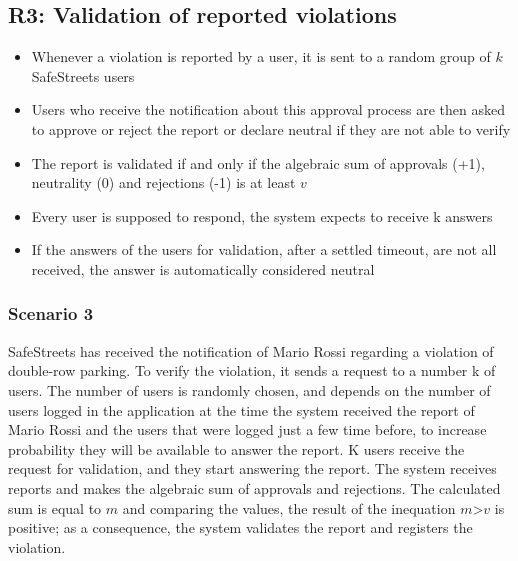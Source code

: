 \subsection{R3: Validation of reported violations}
\begin{itemize}
    \item Whenever a violation is reported by a user, it is sent to a random group of $k$ SafeStreets users
    \item Users who receive the notification about this approval process are then asked to approve or reject the report or declare neutral if they are not able to verify
    \item The report is validated if and only if the algebraic sum of approvals (+1), neutrality (0) and rejections (-1) is at least $v$
    \item Every user is supposed to respond, the system expects to receive k answers
    \item If the answers of the users for validation, after a settled timeout, are not all received, the answer is automatically considered neutral
\end{itemize}
\subsubsection{Scenario 3}
SafeStreets has received the notification of Mario Rossi regarding a violation of double-row parking. To verify the violation, it sends a request to a number k of users. The number of users is randomly chosen, and depends on the number of users logged in the application at the time the system received the report of Mario Rossi
and the users that were logged just a few time before, to increase probability they will be available to answer the report. K users receive the request for validation, and they start 
answering the report. The system receives reports and makes the algebraic sum of approvals and rejections. The calculated sum is equal to $m$ and comparing the values, the result of the 
inequation $m$>$v$ is positive; as a consequence, the system validates the report and registers the violation.

